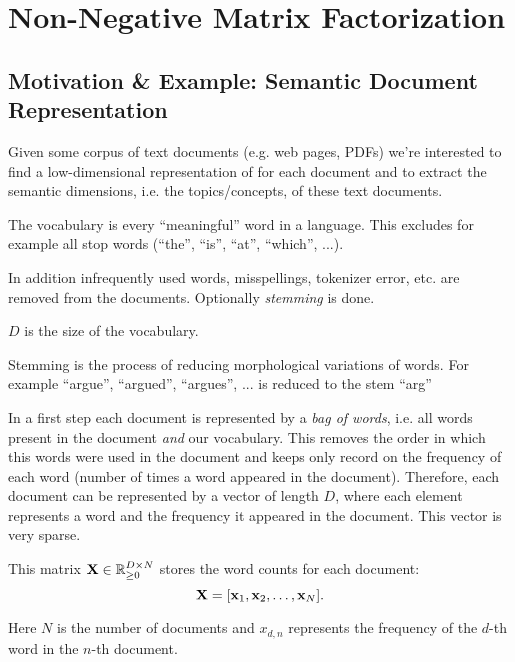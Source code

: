 \chapter{Non-Negative Matrix Factorization}

\section{Motivation \& Example: Semantic Document Representation}
Given some corpus of text documents (e.g. web pages, PDFs) we're interested to find a low-dimensional representation of for each document and to extract the semantic dimensions, i.e. the topics/concepts, of these text documents.

\begin{definition}[Vocabulary]
The vocabulary is every ``meaningful'' word in a language. This excludes for example all stop words (``the'', ``is'', ``at'', ``which'', ...).

In addition infrequently used words, misspellings, tokenizer error, etc. are removed from the documents. Optionally \emph{stemming} is done.

\(D\) is the size of the vocabulary.
\end{definition}

\begin{remark}[Stemming]
Stemming is the process of reducing morphological variations of words. For example ``argue'', ``argued'', ``argues'', ... is reduced to the stem ``arg''
\end{remark}

In a first step each document is represented by a \textit{bag of words}, i.e. all words present in the document \emph{and} our vocabulary. This removes the order in which this words were used in the document and keeps only record on the frequency  of each word (number of times a word appeared in the document). Therefore, each document can be represented by a vector of length \(D\), where each element represents a word and the frequency it appeared in the document. This vector is very sparse.

\begin{definition}
This matrix \(\boldsymbol{\mathrm{X}} \in \mathbb{R}_{\geq 0}^{D \times N}\) stores the word counts for each document:
\[
\boldsymbol{\mathrm{X}} = [\boldsymbol{\mathrm{x}}_1, \boldsymbol{\mathrm{x}}_2, \ldots, \boldsymbol{\mathrm{x}}_N].
\]

Here \(N\) is the number of documents and \(x_{d,n}\) represents the frequency of the \(d\)-th word in the \(n\)-th document.
\end{definition}

